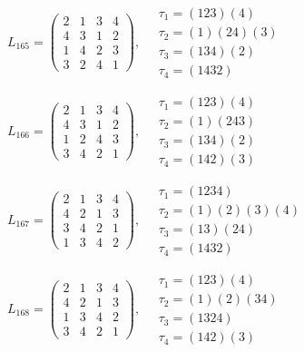 $L_{165} = \begin{pmatrix} 2 & 1 & 3 & 4 \\ 4 & 3 & 1 & 2 \\ 1 & 4 & 2 & 3 \\ 3 & 2 & 4 & 1 \end{pmatrix}, \quad \begin{matrix} \tau_{1} = (1 2 3)(4) \\ \tau_{2} = (1)(2 4)(3) \\ \tau_{3} = (1 3 4)(2) \\ \tau_{4} = (1 4 3 2) \end{matrix}$

$L_{166} = \begin{pmatrix} 2 & 1 & 3 & 4 \\ 4 & 3 & 1 & 2 \\ 1 & 2 & 4 & 3 \\ 3 & 4 & 2 & 1 \end{pmatrix}, \quad \begin{matrix} \tau_{1} = (1 2 3)(4) \\ \tau_{2} = (1)(2 4 3) \\ \tau_{3} = (1 3 4)(2) \\ \tau_{4} = (1 4 2)(3) \end{matrix}$

$L_{167} = \begin{pmatrix} 2 & 1 & 3 & 4 \\ 4 & 2 & 1 & 3 \\ 3 & 4 & 2 & 1 \\ 1 & 3 & 4 & 2 \end{pmatrix}, \quad \begin{matrix} \tau_{1} = (1 2 3 4) \\ \tau_{2} = (1)(2)(3)(4) \\ \tau_{3} = (1 3)(2 4) \\ \tau_{4} = (1 4 3 2) \end{matrix}$

$L_{168} = \begin{pmatrix} 2 & 1 & 3 & 4 \\ 4 & 2 & 1 & 3 \\ 1 & 3 & 4 & 2 \\ 3 & 4 & 2 & 1 \end{pmatrix}, \quad \begin{matrix} \tau_{1} = (1 2 3)(4) \\ \tau_{2} = (1)(2)(3 4) \\ \tau_{3} = (1 3 2 4) \\ \tau_{4} = (1 4 2)(3) \end{matrix}$

